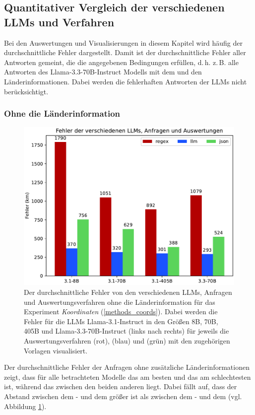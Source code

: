 \subsection{Quantitativer Vergleich der verschiedenen LLMs und Verfahren}
Bei den Auswertungen und Visualisierungen in diesem Kapitel wird häufig der durchschnittliche Fehler dargestellt.
Damit ist der durchschnittliche Fehler aller Antworten gemeint, die die angegebenen Bedingungen erfüllen, d.\,h. z.\,B. alle Antworten des Llama-3.3-70B-Instruct Modells mit dem \jsonv{} und den Länderinformationen.
Dabei werden die fehlerhaften Antworten der LLMs nicht berücksichtigt.

\subsubsection*{Ohne die Länderinformation}

\begin{figure}[tb] %
    \centering
    \includegraphics[width=0.7\columnwidth]{img/size_template_error_no_std.pdf}
    \caption{Der durchschnittliche Fehler von den verschiedenen LLMs, Anfragen und Auswertungsverfahren ohne die Länderinformation für das Experiment \textit{Koordinaten} (\ref{methods_coords}). Dabei werden die Fehler für die LLMs Llama-3.1-Instruct in den Größen 8B, 70B, 405B und Llama-3.3-70B-Instruct (links nach rechts) für jeweils die Auswertungsverfahren \regex{} (rot), \llm{} (blau) und \json{} (grün) mit den zugehörigen Vorlagen visualisiert.}
    \label{fig_res_coords_error}
\end{figure}

Der durchschnittliche Fehler der Anfragen ohne zusätzliche Länderinformationen zeigt, dass für alle betrachteten Modelle das \llmv{} am besten und das \regexv{} am schlechtesten ist, während das \jsonv{} zwischen den beiden anderen liegt.
Dabei fällt auf, dass der Abstand zwischen dem \regex{}- und dem \jsonv{} größer ist als zwischen dem \llm{}- und dem \jsonv{} (vgl. Abbildung \ref{fig_res_coords_error}).

